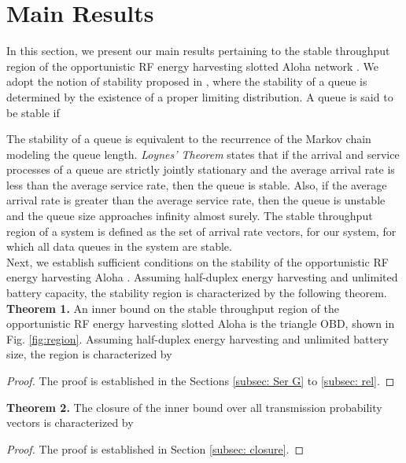 \documentclass[draftcls,12pt,onecolumn]{IEEEtran}
\begin{document}
\section{Main Results} \label{sec:Main_Results}
In this section, we present our main results pertaining to the stable throughput region of 
the opportunistic RF energy harvesting slotted Aloha network . We adopt the notion of stability proposed in \cite{szpankowski}, where the stability of a queue is determined by the existence of a proper limiting distribution. A queue is said to be stable if 

\indent The stability of a queue is equivalent to the recurrence of the Markov chain modeling the queue length. \emph{Loynes' Theorem} \cite{loynes} states that if the arrival and service processes of a queue are strictly jointly stationary and the average arrival rate is less than the average service rate, then the queue is stable. Also, if the average arrival rate is greater than the average service rate, then the queue is unstable and the queue size  approaches infinity almost surely. The stable throughput region of a system is defined as the set of arrival rate vectors,  for our system, for which all data queues in the system are stable.\\
\indent Next, we establish sufficient conditions on the stability of the opportunistic RF energy harvesting Aloha . Assuming half-duplex energy harvesting and unlimited battery capacity, the stability region is characterized by the following theorem.\\
\indent \textbf{Theorem 1.} An inner bound on the stable throughput region of the opportunistic RF energy harvesting slotted Aloha  is the triangle OBD, shown in Fig. \ref{fig:region}. Assuming half-duplex energy harvesting and unlimited battery size, the region is characterized by  

\begin{proof}
The proof is established in the Sections \ref{subsec: Ser G} to \ref{subsec: rel}.
\end{proof}
\indent \textbf{Theorem 2.} The closure of the inner bound  over all transmission probability vectors  is characterized by 
 
\begin{proof}
The proof is established in Section \ref{subsec: closure}.
\end{proof}
\end{document}
